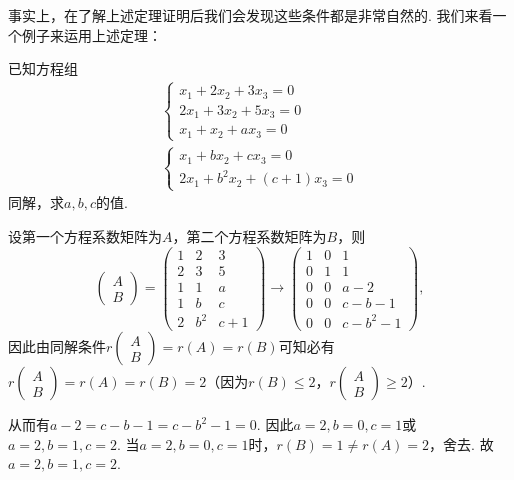 事实上，在了解上述定理证明后我们会发现这些条件都是非常自然的. 我们来看一个例子来运用上述定理：
\begin{example}{}{}
    已知方程组\begin{gather*}
        \begin{cases}
            x_1+2x_2+3x_3=0  \\
            2x_1+3x_2+5x_3=0 \\
            x_1+x_2+ax_3=0
        \end{cases} \\
        \begin{cases}
            x_1+bx_2+cx_3=0 \\
            2x_1+b^2x_2+(c+1)x_3=0
        \end{cases}
    \end{gather*}
    同解，求$a,b,c$的值.
\end{example}
\begin{solution}
    设第一个方程系数矩阵为$A$，第二个方程系数矩阵为$B$，则
    \[\begin{pmatrix}
            A \\ B
        \end{pmatrix}=\begin{pmatrix}
            1 & 2 & 3 \\ 2 & 3 & 5 \\ 1 & 1 & a \\ 1 & b & c \\ 2 & b^2 & c+1
        \end{pmatrix}\to\begin{pmatrix}
            1 & 0 & 1 \\ 0 & 1 & 1 \\ 0 & 0 & a-2 \\ 0 & 0 & c-b-1 \\ 0 & 0 & c-b^2-1
        \end{pmatrix},\]
    因此由同解条件$r\begin{pmatrix}
            A \\ B
        \end{pmatrix}=r(A)=r(B)$可知必有$r\begin{pmatrix}
            A \\ B
        \end{pmatrix}=r(A)=r(B)=2$（因为$r(B)\leqslant 2$，$r\begin{pmatrix}
            A \\ B
        \end{pmatrix}\geqslant 2$）.

    从而有$a-2=c-b-1=c-b^2-1=0$. 因此$a=2,b=0,c=1$或$a=2,b=1,c=2$. 当$a=2,b=0,c=1$时，$r(B)=1\neq r(A)=2$，舍去. 故$a=2,b=1,c=2$.
\end{solution}

